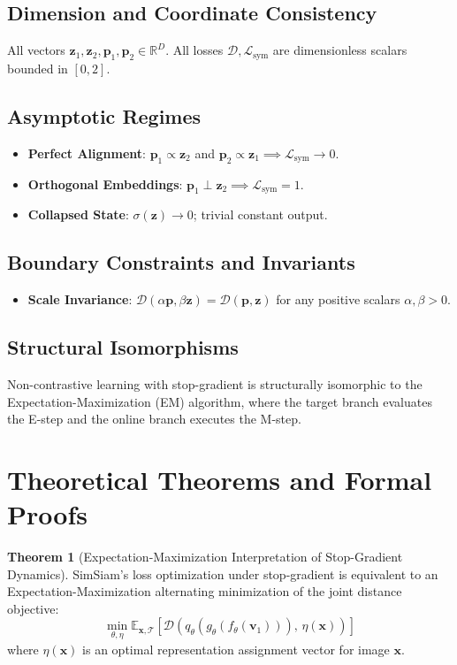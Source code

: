 \documentclass[11pt,a4paper]{article}
\theoremstyle{definition}
\newtheorem{theorem}{\textbf{Theorem}}[section]
\begin{document}
\subsection{Dimension and Coordinate Consistency}
All vectors $\mathbf{z}_1, \mathbf{z}_2, \mathbf{p}_1, \mathbf{p}_2 \in \mathbb{R}^D$. All losses $\mathcal{D}, \mathcal{L}_{\text{sym}}$ are dimensionless scalars bounded in $[0, 2]$.

\subsection{Asymptotic Regimes}
\begin{itemize}
    \item \textbf{Perfect Alignment}: $\mathbf{p}_1 \propto \mathbf{z}_2$ and $\mathbf{p}_2 \propto \mathbf{z}_1 \implies \mathcal{L}_{\text{sym}} \to 0$.
    \item \textbf{Orthogonal Embeddings}: $\mathbf{p}_1 \perp \mathbf{z}_2 \implies \mathcal{L}_{\text{sym}} = 1$.
    \item \textbf{Collapsed State}: $\sigma(\mathbf{z}) \to 0$; trivial constant output.
\end{itemize}

\subsection{Boundary Constraints and Invariants}
\begin{itemize}
    \item \textbf{Scale Invariance}: $\mathcal{D}(\alpha \mathbf{p}, \beta \mathbf{z}) = \mathcal{D}(\mathbf{p}, \mathbf{z})$ for any positive scalars $\alpha, \beta > 0$.
\end{itemize}

\subsection{Structural Isomorphisms}
Non-contrastive learning with stop-gradient is structurally isomorphic to the Expectation-Maximization (EM) algorithm, where the target branch evaluates the E-step and the online branch executes the M-step.

\section{Theoretical Theorems and Formal Proofs}

\begin{theorem}[Expectation-Maximization Interpretation of Stop-Gradient Dynamics]
SimSiam's loss optimization under stop-gradient is equivalent to an Expectation-Maximization alternating minimization of the joint distance objective:
{\boldmath
\begin{equation}
\min_{\theta, \eta} \mathbb{E}_{\mathbf{x}, \mathcal{T}}\left[ \mathcal{D}\left( q_\theta(g_\theta(f_\theta(\mathbf{v}_1))), \, \eta(\mathbf{x}) \right) \right]
\end{equation}
}
where $\eta(\mathbf{x})$ is an optimal representation assignment vector for image $\mathbf{x}$.
\end{theorem}
\end{document}
